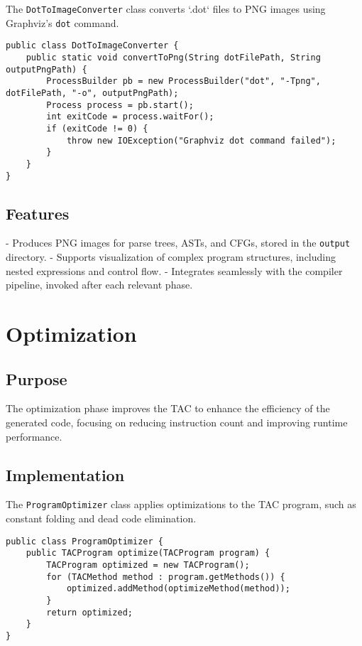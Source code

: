 \documentclass[titlepage]{article}
\begin{document}
The \texttt{DotToImageConverter} class converts `.dot` files to PNG images using Graphviz's \texttt{dot} command.

\begin{lstlisting}
public class DotToImageConverter {
    public static void convertToPng(String dotFilePath, String outputPngPath) {
        ProcessBuilder pb = new ProcessBuilder("dot", "-Tpng", dotFilePath, "-o", outputPngPath);
        Process process = pb.start();
        int exitCode = process.waitFor();
        if (exitCode != 0) {
            throw new IOException("Graphviz dot command failed");
        }
    }
}
\end{lstlisting}

\subsection{Features}

- Produces PNG images for parse trees, ASTs, and CFGs, stored in the \texttt{output} directory.
- Supports visualization of complex program structures, including nested expressions and control flow.
- Integrates seamlessly with the compiler pipeline, invoked after each relevant phase.

\section{Optimization}

\subsection{Purpose}

The optimization phase improves the TAC to enhance the efficiency of the generated code, focusing on reducing instruction count and improving runtime performance.

\subsection{Implementation}

The \texttt{ProgramOptimizer} class applies optimizations to the TAC program, such as constant folding and dead code elimination.

\begin{lstlisting}
public class ProgramOptimizer {
    public TACProgram optimize(TACProgram program) {
        TACProgram optimized = new TACProgram();
        for (TACMethod method : program.getMethods()) {
            optimized.addMethod(optimizeMethod(method));
        }
        return optimized;
    }
}
\end{lstlisting}
\end{document}
